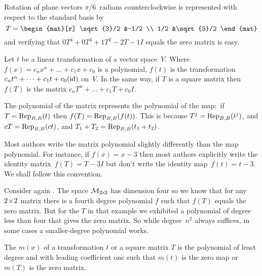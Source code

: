 \begin{example}  \label{ex:PolySendRotMatToZ}
Rotation of plane vectors \( \pi/6 \)~radians counterclockwise is represented
with respect to the standard basis by
\begin{equation*}
  T=
  \begin{mat}[r]
     \sqrt{3}/2  &-1/2  \\
     1/2         &\sqrt{3}/2
  \end{mat}
\end{equation*}
and verifying that \( 0T^4+0T^3+1T^2-2T-1I \) equals the zero matrix is easy.
\end{example}

\begin{definition}
Let \( t \) be a linear transformation of a vector space~\( V \).
Where \( f(x)=c_nx^n+\dots+c_1x+c_0 \) is a polynomial,
\( f(t) \) is the
transformation \( c_nt^n+\dots+c_1t+c_0(\identity) \) on~\( V \).
In the same way, if \( T \) is a square matrix
then
\( f(T) \) is the matrix \( c_nT^n+\dots+c_1T+c_0I \).
\end{definition}

\noindent The polynomial of the matrix represents the polynomial of the map:~if 
\( T=\rep{t}{B,B} \) then \( f(T)=\rep{f(t)}{B,B} \).
This is because \( T^j=\rep{t^j}{B,B} \),
and \( cT=\rep{ct}{B,B} \), and \( T_1+T_2 =\rep{t_1+t_2}{B,B} \).

\begin{remark}
Most authors write the matrix polynomial slightly differently than the 
map polynomial. 
For instance, if  \( f(x)=x-3 \) then 
most authors explicitly write the identity matrix~\( f(T)=T-3I \)
but don't write the identity map~\( f(t)=t-3 \).
We shall follow this convention.
\end{remark}

Consider again .
The space $\matspace_{\nbyn{2}}$ has dimension four so we know that for any
\( \nbyn{2} \) matrix there is a fourth degree polynomial \( f  \) such that
\( f(T) \) equals the zero matrix. 
But for the \( T \) in that example  
we exhibited a polynomial of degree less than four that gives the zero matrix. 
So while
degree~$n^2$ always suffices, in some cases  
a smaller-degree polynomial works.

\begin{definition}
The %
\( m(x) \) of a transformation \( t \)
or a square matrix \( T \) is the
polynomial of least degree and with leading coefficient one
such that \( m(t) \) is the zero map or \( m(T) \) is the zero matrix.
\end{definition}

